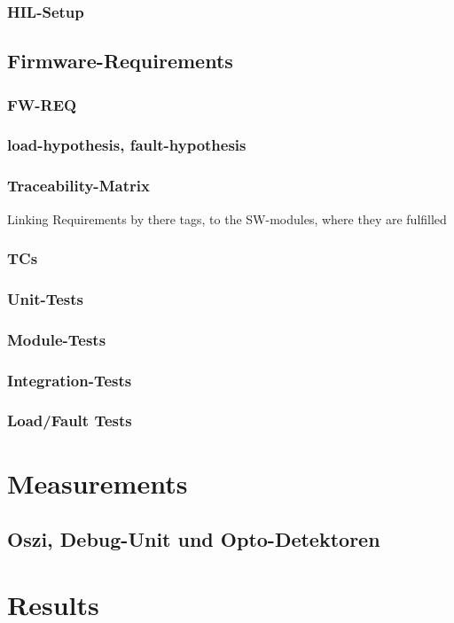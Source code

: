 \documentclass[master,english,smartquotes,apa]{hgbthesis}
\begin{document}
			\subsection{HIL-Setup}
			
		\section{Firmware-Requirements}
			\subsection{FW-REQ}
			\subsection{load-hypothesis, fault-hypothesis}
			\subsection{Traceability-Matrix}
			Linking Requirements by there tags, to the SW-modules, where they are fulfilled
			\subsection{TCs}
			\subsection{Unit-Tests}
			\subsection{Module-Tests}
			\subsection{Integration-Tests}
			\subsection{Load/Fault Tests}
			
		
	\chapter{Measurements}
		\section{Oszi, Debug-Unit und Opto-Detektoren}

	\chapter{Results}
	\label{cha:Results}
\end{document}
